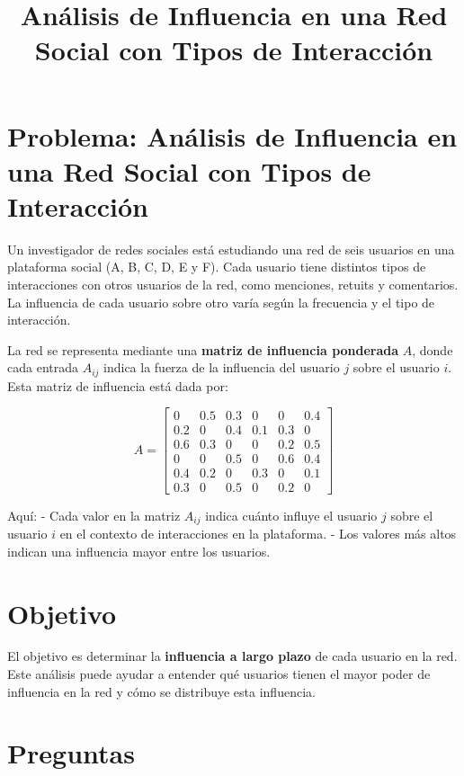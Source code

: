\documentclass{article}
\begin{document}
\title{Análisis de Influencia en una Red Social con Tipos de Interacción}
\author{}
\date{}
\maketitle

\section*{Problema: Análisis de Influencia en una Red Social con Tipos de Interacción}

Un investigador de redes sociales está estudiando una red de seis usuarios en una plataforma social (A, B, C, D, E y F). Cada usuario tiene distintos tipos de interacciones con otros usuarios de la red, como menciones, retuits y comentarios. La influencia de cada usuario sobre otro varía según la frecuencia y el tipo de interacción.

La red se representa mediante una \textbf{matriz de influencia ponderada} \( A \), donde cada entrada \( A_{ij} \) indica la fuerza de la influencia del usuario \( j \) sobre el usuario \( i \). Esta matriz de influencia está dada por:

\[
A = \begin{bmatrix} 
0 & 0.5 & 0.3 & 0 & 0 & 0.4 \\ 
0.2 & 0 & 0.4 & 0.1 & 0.3 & 0 \\ 
0.6 & 0.3 & 0 & 0 & 0.2 & 0.5 \\ 
0 & 0 & 0.5 & 0 & 0.6 & 0.4 \\ 
0.4 & 0.2 & 0 & 0.3 & 0 & 0.1 \\ 
0.3 & 0 & 0.5 & 0 & 0.2 & 0 
\end{bmatrix}
\]

Aquí:
- Cada valor en la matriz \( A_{ij} \) indica cuánto influye el usuario \( j \) sobre el usuario \( i \) en el contexto de interacciones en la plataforma.
- Los valores más altos indican una influencia mayor entre los usuarios.

\section*{Objetivo}

El objetivo es determinar la \textbf{influencia a largo plazo} de cada usuario en la red. Este análisis puede ayudar a entender qué usuarios tienen el mayor poder de influencia en la red y cómo se distribuye esta influencia.

\section*{Preguntas}
\end{document}
